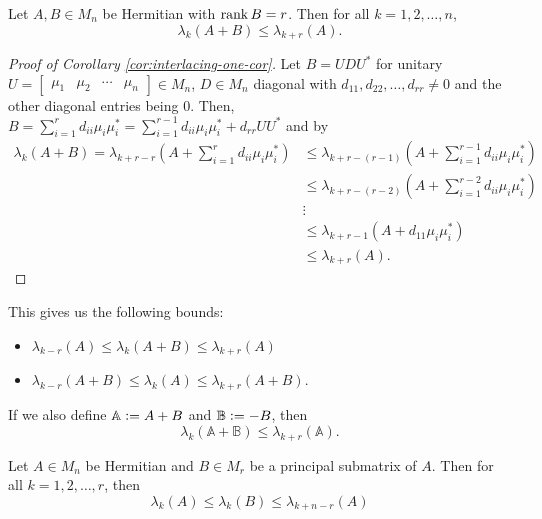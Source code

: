 \begin{corollary}
\label{cor:interlacing-one-cor}
Let $A, B \in M_n$ be Hermitian with $\operatorname{rank} B = r$. Then for all $k = 1, 2, \dots, n$,
$$
\lambda_k(A+B) \leq \lambda_{k+r}(A).
$$
\end{corollary}

\begin{proof}[Proof of Corollary \ref{cor:interlacing-one-cor}]
Let $B = UDU^*$ for unitary $U = [\begin{array}{c|c|c|c}\mu_1 & \mu_2 & \cdots & \mu_n\end{array}] \in M_n$, $D \in M_n$ diagonal with $d_{11}, d_{22}, \dots, d_{rr} \not= 0$ and the other diagonal entries being 0. Then, $B = \sum_{i=1}^r d_{ii}\mu_i\mu_i^* = \sum_{i=1}^{r-1} d_{ii}\mu_i\mu_i^* + d_{rr}UU^*$ and by 
\begin{align*}
    \lambda_k(A+B) = \lambda_{k+r-r}\left(A + \sum_{i=1}^r d_{ii}\mu_i\mu_i^*\right) 
        &\leq \lambda_{k+r-(r-1)}\left(A + \sum_{i=1}^{r-1} d_{ii}\mu_i\mu_i^*\right) \\
        &\leq \lambda_{k+r-(r-2)}\left(A + \sum_{i=1}^{r-2} d_{ii}\mu_i\mu_i^*\right) \\
        &\vdots \\
        &\leq \lambda_{k+r-1}\left(A + d_{11}\mu_i\mu_i^*\right) \\
        &\leq \lambda_{k+r}(A).
\end{align*}
\end{proof}
\noindent This gives us the following bounds:
\begin{itemize}
    \item $\lambda_{k-r}(A) \leq \lambda_k(A+B) \leq \lambda_{k+r}(A)$
    \item $\lambda_{k-r}(A+B) \leq \lambda_k(A) \leq \lambda_{k+r}(A+B)$.
\end{itemize}
If we also define $\mathbb{A} \vcentcolon= A + B$ and $\mathbb{B} \vcentcolon= -B$, then
$$
\lambda_k(\mathbb{A} + \mathbb{B}) \leq \lambda_{k+r}(\mathbb{A}).
$$

\begin{theorem}
\label{thm:interlacing-two}
Let $A \in M_n$ be Hermitian and $B \in M_r$ be a principal submatrix of $A$. Then for all $k = 1, 2, \dots, r$, then
$$
\lambda_k(A) \leq \lambda_k(B) \leq \lambda_{k+n-r}(A)
$$
\end{theorem}

